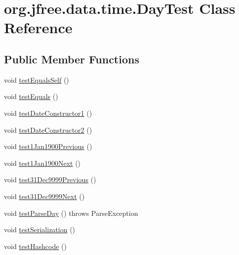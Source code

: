 \hypertarget{classorg_1_1jfree_1_1data_1_1time_1_1_day_test}{}\section{org.\+jfree.\+data.\+time.\+Day\+Test Class Reference}
\label{classorg_1_1jfree_1_1data_1_1time_1_1_day_test}
\subsection*{Public Member Functions}
\begin{DoxyCompactItemize}
\item 
void \mbox{\hyperlink{classorg_1_1jfree_1_1data_1_1time_1_1_day_test_a19252a7f6e619498e28ec562bef2591f}{test\+Equals\+Self}} ()
\item 
void \mbox{\hyperlink{classorg_1_1jfree_1_1data_1_1time_1_1_day_test_ac28c4bdfbbacb739002214f523ad8388}{test\+Equals}} ()
\item 
void \mbox{\hyperlink{classorg_1_1jfree_1_1data_1_1time_1_1_day_test_aeecbbf528aecf7614a447270aea402e0}{test\+Date\+Constructor1}} ()
\item 
void \mbox{\hyperlink{classorg_1_1jfree_1_1data_1_1time_1_1_day_test_a2ae9096690d519bb9249f282eaa930f6}{test\+Date\+Constructor2}} ()
\item 
void \mbox{\hyperlink{classorg_1_1jfree_1_1data_1_1time_1_1_day_test_abe741da7c1751c04f7ab094ed7711e07}{test1\+Jan1900\+Previous}} ()
\item 
void \mbox{\hyperlink{classorg_1_1jfree_1_1data_1_1time_1_1_day_test_a4fe4cc974ebaa125bd4fe90bf14b99cf}{test1\+Jan1900\+Next}} ()
\item 
void \mbox{\hyperlink{classorg_1_1jfree_1_1data_1_1time_1_1_day_test_acefd3195f8258c48f05b33e7215d5da0}{test31\+Dec9999\+Previous}} ()
\item 
void \mbox{\hyperlink{classorg_1_1jfree_1_1data_1_1time_1_1_day_test_a58540379b628e1a9d6a2cc4bafa1db7a}{test31\+Dec9999\+Next}} ()
\item 
void \mbox{\hyperlink{classorg_1_1jfree_1_1data_1_1time_1_1_day_test_a03c13ce6817e379ab96a4fc82e312205}{test\+Parse\+Day}} ()  throws Parse\+Exception 
\item 
void \mbox{\hyperlink{classorg_1_1jfree_1_1data_1_1time_1_1_day_test_a374dbcd1488d96abd1d778213a784a55}{test\+Serialization}} ()
\item 
void \mbox{\hyperlink{classorg_1_1jfree_1_1data_1_1time_1_1_day_test_abfa78e349ed35de71dee26b43e97f4c9}{test\+Hashcode}} ()

\end{DoxyCompactItemize}
